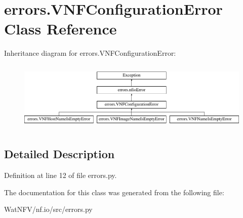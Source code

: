 \hypertarget{classerrors_1_1VNFConfigurationError}{\section{errors.\-V\-N\-F\-Configuration\-Error Class Reference}
\label{classerrors_1_1VNFConfigurationError}
}
Inheritance diagram for errors.\-V\-N\-F\-Configuration\-Error\-:\begin{figure}[H]
\begin{center}
\leavevmode
\includegraphics[height=3.348281cm]{classerrors_1_1VNFConfigurationError}
\end{center}
\end{figure}


\subsection{Detailed Description}


Definition at line 12 of file errors.\-py.



The documentation for this class was generated from the following file\-:\begin{DoxyCompactItemize}
\item 
Wat\-N\-F\-V/nf.\-io/src/errors.\-py\end{DoxyCompactItemize}
